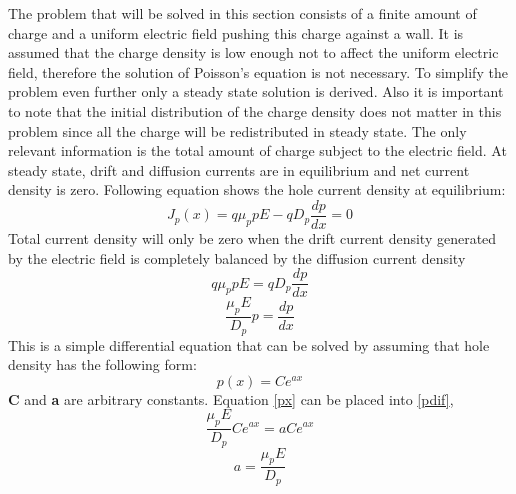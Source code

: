 \begin{doublespace}
The problem that will be solved in this section consists of a finite amount of charge and a uniform electric field pushing this charge against a wall. It is assumed that the charge density is low enough not to affect the uniform electric field, therefore the solution of Poisson's equation is not necessary. To simplify the problem even further only a steady state solution is derived. Also it is important to note that the initial distribution of the charge density does not matter in this problem since all the charge will be redistributed in steady state. The only relevant information is the total amount of charge subject to the electric field. At steady state, drift and diffusion currents are in equilibrium and net current density is zero. Following equation shows the hole current density at equilibrium:
\begin{equation}
J_p(x)=q \mu_{p} p E-qD_{p} \frac{dp}{dx} =0
\end{equation}
Total current density will only be zero when the drift current density generated by the electric field is completely balanced by the diffusion current density 
\begin{equation}
q \mu_{p} p E=qD_{p} \frac{dp}{dx}
\end{equation}
\begin{equation}
 \frac{\mu_{p} E}{D_{p}} p  = \frac{dp}{dx}
 \label{pdif}
\end{equation}
This is a simple differential equation that can be solved by assuming that hole density has the following form:
\begin{equation}
p(x)=Ce^{ax}
\label{px}
\end{equation}
\textbf{C} and \textbf{a} are arbitrary constants. Equation \eqref{px} can be placed into \eqref{pdif},
\begin{equation}
 \frac{\mu_{p} E}{D_{p}} Ce^{ax}  = a Ce^{ax}
\end{equation}
\begin{equation}
a=\frac{\mu_{p} E}{D_{p}}
\end{equation}


\end{doublespace}
